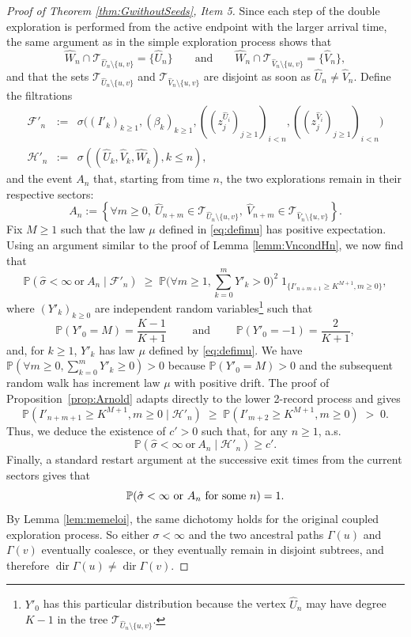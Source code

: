\documentclass[french]{article}
\newcommand{\zi}{z}
\renewcommand{\P}{\mathbb{P}}
\newcommand{\T}{\mathcal{T}}
\renewcommand{\dir}{\mathop{dir}}
\renewcommand{\1}{\mathds{1}}
\begin{document}
\begin{proof}[Proof of Theorem \ref{thm:GwithoutSeeds}, Item 5]
Since each step of the double exploration is performed from the active endpoint with the larger arrival time, the same argument as in the simple exploration process shows that
$$
\hat{W}_n \cap \T_{\hat{U}_n \setminus \{u,v\}} = \{\hat{U}_n\}
\qquad \text{and} \qquad
\hat{W}_n \cap \T_{\hat{V}_n \setminus \{u,v\}} = \{\hat{V}_n\},
$$
and that the sets $\T_{\hat{U}_n \setminus \{u,v\}}$ and $\T_{\hat{V}_n \setminus \{u,v\}}$ are disjoint 
as soon as $\hat{U}_n\neq \hat{V}_n$. Define the filtrations
\begin{eqnarray*}
  \mathcal{F}'_n&:=&\sigma\bigl((I'_k)_{k\ge 1}, (\beta_k)_{k\ge 1}, ((\zi_j^{\hat{U}_i})_{j\ge 1})_{i< n}, ((\zi_j^{\hat{V}_i})_{j\ge 1})_{i< n}\bigr)\\
\mathcal{H}'_n&:=&\sigma((\hat{U}_k,\hat{V}_k,\hat{W}_k), k\le n),
\end{eqnarray*}
and the event $A_n$ that, starting from time $n$, the two explorations remain in their respective sectors:
\[
A_n:=\left\{\forall m\ge 0,\ 
\hat{U}_{n+m}\in \T_{\hat{U}_n \setminus \{u,v\}},\ 
\hat{V}_{n+m}\in \T_{\hat{V}_n \setminus \{u,v\}}\right\}.
\]
Fix $M\ge1$ such that the law $\mu$ defined in \eqref{eq:defimu} has positive expectation. Using an argument similar to the proof of Lemma \ref{lemm:VncondHn}, we now find that
$$\P(\hat{\sigma}<\infty \ \text{or}\ A_n \mid \mathcal{F}'_n) \;\ge \; \P\Big(\forall m\ge 1, \sum_{k=0}^m Y'_{k} > 0\Big)^2 \; 1_{\{I'_{n+m+1} \ge K^{M+1}, m\ge 0\}},$$
where $(Y'_{k})_{k\ge 0}$ are independent random variables\footnote{$Y'_0$ has this particular distribution because the vertex $\hat{U}_n$ may have degree $K-1$ in the tree $\T_{\hat{U}_n \setminus \{u,v\}}$.} such that
$$\P(Y'_0=M)=\frac{K-1}{K+1} \qquad \mbox{ and } \qquad \P(Y'_0=-1)=\frac{2}{K+1},$$
and, for $k\ge 1$, $Y'_{k}$ has law $\mu$ defined by \eqref{eq:defimu}. We have $\P(\forall m\ge0,\sum_{k=0}^mY'_k\ge0) >0$ because $\P(Y'_0=M)>0$ and the subsequent random walk has increment law $\mu$ with positive drift.
The proof of Proposition~\ref{prop:Arnold} adapts directly to the lower 2-record process and gives
$$\P(I'_{n+m+1} \ge K^{M+1}, m\ge 0\mid \mathcal{H}'_n) \;\ge\; \P( I'_{m+2} \ge K^{M+1}, m\ge 0) \;>\; 0.$$
Thus, we deduce the existence of $c'>0$ such that, for any $n\ge 1$, a.s.
$$\P(\hat{\sigma}<\infty \ \text{or}\ A_n\mid \mathcal{H}'_n)\ge c'.$$
Finally, a standard restart argument at the successive exit times from the current sectors gives that
$$\P(\hat{\sigma}<\infty \ \text{or}\ A_n \hbox{ for some $n$})= 1.$$
By Lemma \ref{lem:memeloi}, the same dichotomy holds for the original coupled exploration process. So either $\sigma < \infty$ and the two ancestral paths $\Gamma(u)$ and $\Gamma(v)$ eventually coalesce, or they eventually remain in disjoint subtrees, and therefore $\dir \Gamma(u)\neq \dir \Gamma(v)$.
\end{proof}
\end{document}
